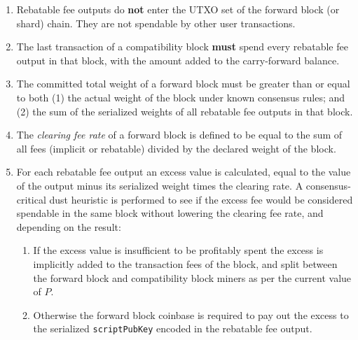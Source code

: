 \begin{enumerate}

  \item

    Rebatable fee outputs do \textbf{not} enter the UTXO set of the
    forward block (or shard) chain.  They are not spendable by other
    user transactions.

  \item

    The last transaction of a compatibility block \textbf{must} spend
    every rebatable fee output in that block, with the amount added to
    the carry-forward balance.

  \item

    The committed total weight of a forward block must be greater than
    or equal to both (1) the actual weight of the block under known
    consensus rules; and (2) the sum of the serialized weights of all
    rebatable fee outputs in that block.

  \item

    The \emph{clearing fee rate} of a forward block is defined to be
    equal to the sum of all fees (implicit or rebatable) divided by
    the declared weight of the block.

  \item

    For each rebatable fee output an excess value is calculated, equal
    to the value of the output minus its serialized weight times the
    clearing rate.  A consensus-critical dust heuristic is performed
    to see if the excess fee would be considered spendable in the same
    block without lowering the clearing fee rate, and depending on the
    result:

    \begin{enumerate}

      \item

        If the excess value is insufficient to be profitably spent the
        excess is implicitly added to the transaction fees of the
        block, and split between the forward block and compatibility
        block miners as per the current value of $P$.

      \item

        Otherwise the forward block coinbase is required to pay out
        the excess to the serialized {\tt scriptPubKey} encoded in the
        rebatable fee output.

    \end{enumerate}

\end{enumerate}

